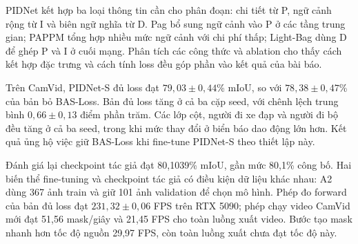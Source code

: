 PIDNet kết hợp ba loại thông tin cần cho phân đoạn: chi tiết từ P, ngữ cảnh rộng từ I và biên ngữ nghĩa từ D. Pag bổ sung ngữ cảnh vào P ở các tầng trung gian; PAPPM tổng hợp nhiều mức ngữ cảnh với chi phí thấp; Light-Bag dùng D để ghép P và I ở cuối mạng. Phân tích các công thức và ablation cho thấy cách kết hợp đặc trưng và cách tính loss đều góp phần vào kết quả của bài báo.

Trên CamVid, PIDNet-S đủ loss đạt $79{,}03\pm0{,}44$\% mIoU, so với $78{,}38\pm0{,}47$\% của bản bỏ BAS-Loss. Bản đủ loss tăng ở cả ba cặp seed, với chênh lệch trung bình $0{,}66\pm0{,}13$ điểm phần trăm. Các lớp cột, người đi xe đạp và người đi bộ đều tăng ở cả ba seed, trong khi mức thay đổi ở biển báo dao động lớn hơn. Kết quả ủng hộ việc giữ BAS-Loss khi fine-tune PIDNet-S theo thiết lập này.

Đánh giá lại checkpoint tác giả đạt 80,1039\% mIoU, gần mức 80,1\% công bố. Hai biến thể fine-tuning và checkpoint tác giả có điều kiện dữ liệu khác nhau: A2 dùng 367 ảnh train và giữ 101 ảnh validation để chọn mô hình. Phép đo forward của bản đủ loss đạt $231{,}32\pm0{,}06$ FPS trên RTX 5090; phép chạy video CamVid mới đạt 51,56 mask/giây và 21,45 FPS cho toàn luồng xuất video. Bước tạo mask nhanh hơn tốc độ nguồn 29,97 FPS, còn toàn luồng xuất chưa đạt tốc độ này.
